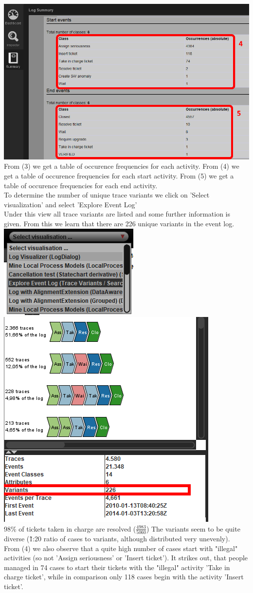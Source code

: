 \documentclass[../../main.tex]{subfiles}
\begin{document}
\includegraphics[width=0.5\columnwidth]{img/ProM_a_summary_2.png}\\
From (3) we get a table of occurence frequencies for each activity. From (4) we get a table of occurence frequencies for each start activity. From (5) we get a table of occurence frequencies for each end activity.\\
To determine the number of unique trace variants we click on 'Select visualization' and select 'Explore Event Log'\\
Under this view all trace variants are listed and some further information is given. From this we learn that there are 226 unique variants in the event log.\\
\includegraphics[width=0.5\columnwidth]{img/ProM_a_setting.png}\includegraphics[width=0.5\columnwidth]{img/ProM_a_traces.png}\\

98\% of tickets taken in charge are resolved ($\frac{4983}{5060}$)
The variants seem to be quite diverse (\~1:20 ratio of cases to variants, although distributed very unevenly). \\
From (4) we also observe that a quite high number of cases start with "illegal" activities (so not 'Assign seriousness' or 'Insert ticket'). It strikes out, that people managed in 74 cases to start their tickets with the "illegal" activity 'Take in charge ticket', while in comparison only 118 cases begin with the activity 'Insert ticket'.
\end{document}
